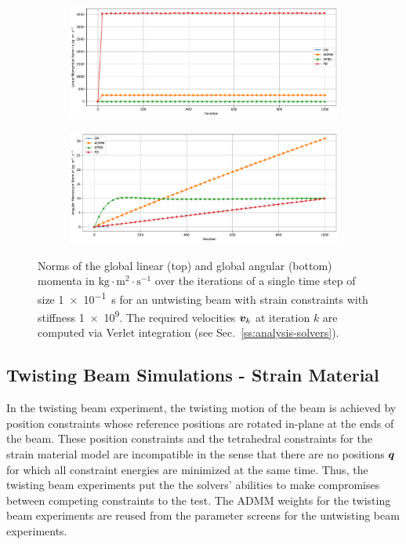 \begin{figure}[h]
    \centering
    \begin{subfigure}{\textwidth}
        \includegraphics[width=\linewidth]{figures/strain_beam_untwist_momenta_large_ts.pdf}
    \end{subfigure}
    \begin{subfigure}{\textwidth}
        \includegraphics[width=\linewidth]{figures/strain_beam_untwist_angular_momenta_large_ts.pdf}
    \end{subfigure}
    \caption{Norms of the global linear (top) and global angular (bottom) momenta in $\text{kg}\cdot\text{m}^2\cdot\text{s}^{-1}$ over the iterations 
    of a single time step of size \SI{1e-1}{\second} for an untwisting beam with strain constraints with stiffness \num{1e9}. The required velocities 
    $\bm{v}_k$ at iteration $k$ are computed via Verlet integration (see Sec.\ \ref{ss:analysis-solvers}).
}
    \label{fig:strain-beam-untwist-momenta-large-ts}
\end{figure}

\subsection{Twisting Beam Simulations - Strain Material}\label{ss:twisting-beam-strain}
In the twisting beam experiment, the twisting motion of the beam is achieved by position constraints whose reference positions are rotated in-plane at the 
ends of the beam. These position constraints and the tetrahedral constraints for the strain material model are incompatible in the sense that there are no 
positions $\bm{q}$ for which all constraint energies are minimized at the same time. Thus, the twisting beam experiments put the the solvers' abilities 
to make compromises between competing constraints to the test. The ADMM weights for the twisting beam experiments are reused from the parameter screens 
for the untwisting beam experiments.

